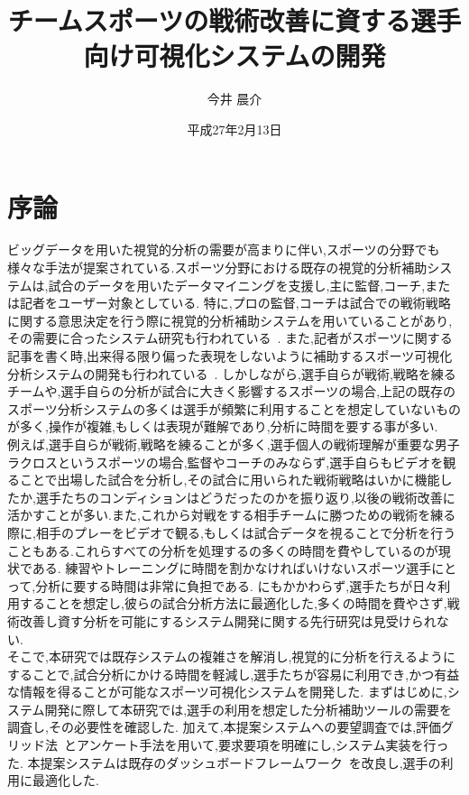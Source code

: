 \documentclass[sotsuron]{kuee}
\title{チームスポーツの戦術改善に資する選手向け可視化システムの開発}
\author{今井 晨介}
\date{平成27年2月13日}
\begin{document}
\maketitle	
\tableofcontents


\chapter{序論}
	ビッグデータを用いた視覚的分析の需要が高まりに伴い,スポーツの分野でも様々な手法が提案されている.スポーツ分野における既存の視覚的分析補助システムは,試合のデータを用いたデータマイニングを支援し,主に監督,コーチ,または記者をユーザー対象としている.
	特に,プロの監督,コーチは試合での戦術戦略に関する意思決定を行う際に視覚的分析補助システムを用いていることがあり,その需要に合ったシステム研究も行われている~\cite{SoccerStory,SnapShot,TenniVis}.
	また,記者がスポーツに関する記事を書く時,出来得る限り偏った表現をしないように補助するスポーツ可視化分析システムの開発も行われている~\cite{SoccerStory}.
	しかしながら,選手自らが戦術,戦略を練るチームや,選手自らの分析が試合に大きく影響するスポーツの場合,上記の既存のスポーツ分析システムの多くは選手が頻繁に利用することを想定していないものが多く,操作が複雑,もしくは表現が難解であり,分析に時間を要する事が多い.
	\\例えば,選手自らが戦術,戦略を練ることが多く,選手個人の戦術理解が重要な男子ラクロスというスポーツの場合,監督やコーチのみならず,選手自らもビデオを観ることで出場した試合を分析し,その試合に用いられた戦術戦略はいかに機能したか,選手たちのコンディションはどうだったのかを振り返り,以後の戦術改善に活かすことが多い.また,これから対戦をする相手チームに勝つための戦術を練る際に,相手のプレーをビデオで観る,もしくは試合データを視ることで分析を行うこともある.これらすべての分析を処理するの多くの時間を費やしているのが現状である.
	練習やトレーニングに時間を割かなければいけないスポーツ選手にとって,分析に要する時間は非常に負担である.
	にもかかわらず,選手たちが日々利用することを想定し,彼らの試合分析方法に最適化した,多くの時間を費やさず,戦術改善し資す分析を可能にするシステム開発に関する先行研究は見受けられない.
	\\そこで,本研究では既存システムの複雑さを解消し,視覚的に分析を行えるようにすることで,試合分析にかける時間を軽減し,選手たちが容易に利用でき,かつ有益な情報を得ることが可能なスポーツ可視化システムを開発した.
	まずはじめに,システム開発に際して本研究では,選手の利用を想定した分析補助ツールの需要を調査し,その必要性を確認した.
	加えて,本提案システムへの要望調査では,評価グリッド法~\cite{EGM}とアンケート手法を用いて,要求要項を明確にし,システム実装を行った.
	本提案システムは既存のダッシュボードフレームワーク~\cite{dashboard}を改良し,選手の利用に最適化した.
\end{document}
